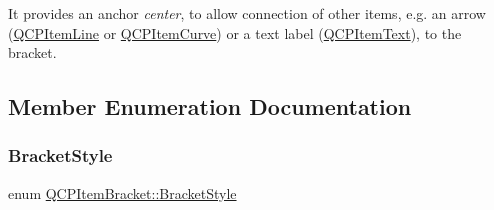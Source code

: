 It provides an anchor {\itshape center}, to allow connection of other items, e.\+g. an arrow (\mbox{\hyperlink{class_q_c_p_item_line}{Q\+C\+P\+Item\+Line}} or \mbox{\hyperlink{class_q_c_p_item_curve}{Q\+C\+P\+Item\+Curve}}) or a text label (\mbox{\hyperlink{class_q_c_p_item_text}{Q\+C\+P\+Item\+Text}}), to the bracket. 

\subsection{Member Enumeration Documentation}
\mbox{\label{class_q_c_p_item_bracket_a7ac3afd0b24a607054e7212047d59dbd}} 
\subsubsection{\texorpdfstring{Bracket\+Style}{BracketStyle}}
{\footnotesize\ttfamily enum \mbox{\hyperlink{class_q_c_p_item_bracket_a7ac3afd0b24a607054e7212047d59dbd}{Q\+C\+P\+Item\+Bracket\+::\+Bracket\+Style}}}

